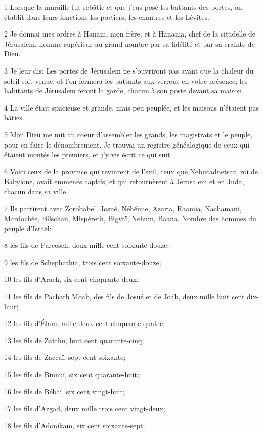 \par 1 Lorsque la muraille fut rebâtie et que j'eus posé les battants des portes, on établit dans leurs fonctions les portiers, les chantres et les Lévites.
\par 2 Je donnai mes ordres à Hanani, mon frère, et à Hanania, chef de la citadelle de Jérusalem, homme supérieur au grand nombre par sa fidélité et par sa crainte de Dieu.
\par 3 Je leur dis: Les portes de Jérusalem ne s'ouvriront pas avant que la chaleur du soleil soit venue, et l'on fermera les battants aux verrous en votre présence; les habitants de Jérusalem feront la garde, chacun à son poste devant sa maison.
\par 4 La ville était spacieuse et grande, mais peu peuplée, et les maisons n'étaient pas bâties.
\par 5 Mon Dieu me mit au coeur d'assembler les grands, les magistrats et le peuple, pour en faire le dénombrement. Je trouvai un registre généalogique de ceux qui étaient montés les premiers, et j'y vis écrit ce qui suit.
\par 6 Voici ceux de la province qui revinrent de l'exil, ceux que Nebucadnetsar, roi de Babylone, avait emmenés captifs, et qui retournèrent à Jérusalem et en Juda, chacun dans sa ville.
\par 7 Ils partirent avec Zorobabel, Josué, Néhémie, Azaria, Raamia, Nachamani, Mardochée, Bilschan, Mispéreth, Bigvaï, Nehum, Baana. Nombre des hommes du peuple d'Israël:
\par 8 les fils de Pareosch, deux mille cent soixante-douze;
\par 9 les fils de Schephathia, trois cent soixante-douze;
\par 10 les fils d'Arach, six cent cinquante-deux;
\par 11 les fils de Pachath Moab, des fils de Josué et de Joab, deux mille huit cent dix-huit;
\par 12 les fils d'Élam, mille deux cent cinquante-quatre;
\par 13 les fils de Zatthu, huit cent quarante-cinq;
\par 14 les fils de Zaccaï, sept cent soixante;
\par 15 les fils de Binnuï, six cent quarante-huit;
\par 16 les fils de Bébaï, six cent vingt-huit;
\par 17 les fils d'Azgad, deux mille trois cent vingt-deux;
\par 18 les fils d'Adonikam, six cent soixante-sept;
